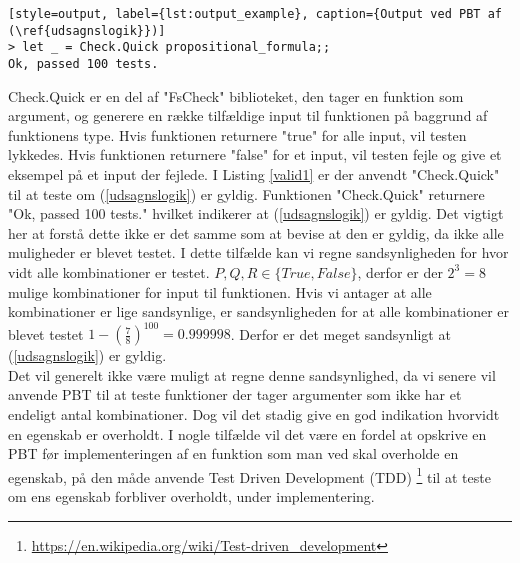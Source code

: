 \begin{lstlisting}[style=output, label={lst:output_example}, caption={Output ved PBT af (\ref{udsagnslogik}})]
> let _ = Check.Quick propositional_formula;;
Ok, passed 100 tests.
\end{lstlisting}

Check.Quick er en del af "FsCheck" biblioteket, den tager en funktion som argument, og generere en række tilfældige input til funktionen på baggrund af funktionens type. Hvis funktionen returnere "true" for alle input, vil testen lykkedes. Hvis funktionen returnere "false" for et input, vil testen fejle og give et eksempel på et input der fejlede. I Listing \ref{valid1} er der anvendt "Check.Quick" til at teste om (\ref{udsagnslogik}) er gyldig. Funktionen "Check.Quick" returnere "Ok, passed 100 tests." hvilket indikerer at (\ref{udsagnslogik}) er gyldig. Det vigtigt her at forstå dette ikke er det samme som at bevise at den er gyldig, da ikke alle muligheder er blevet testet. I dette tilfælde kan vi regne sandsynligheden for hvor vidt alle kombinationer er testet. $P, Q, R \in \{True, False\}$, derfor er der $2^3 = 8$ mulige kombinationer for input til funktionen. Hvis vi antager at alle kombinationer er lige sandsynlige, er sandsynligheden for at alle kombinationer er blevet testet $1 - (\frac{7}{8})^{100} = 0.999998$. Derfor er det meget sandsynligt at (\ref{udsagnslogik}) er gyldig.\\
Det vil generelt ikke være muligt at regne denne sandsynlighed, da vi senere vil anvende PBT til at teste funktioner der tager argumenter som ikke har et endeligt antal kombinationer. Dog vil det stadig give en god indikation hvorvidt en egenskab er overholdt. I nogle tilfælde vil det være en fordel at opskrive en PBT før implementeringen af en funktion som man ved skal overholde en egenskab, på den måde anvende Test Driven Development (TDD) \footnote{\url{https://en.wikipedia.org/wiki/Test-driven_development}} til at teste om ens egenskab forbliver overholdt, under implementering.
